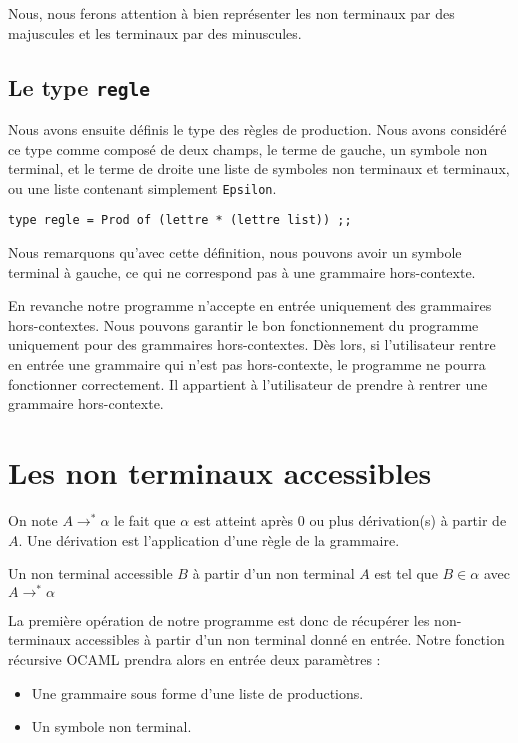 \documentclass[11pt,a4paper]{article}
\def\code#1{\texttt{#1}} %
\begin{document}
Nous, nous ferons attention à bien représenter les non terminaux
par des majuscules et les terminaux par des minuscules.

\subsection{Le type \code{regle}}

Nous avons ensuite définis le type des règles de production.
Nous avons considéré ce type comme composé de deux champs, le
terme de gauche, un symbole non terminal, et le terme de droite
une liste de symboles non terminaux et terminaux, ou une liste
contenant simplement \code{Epsilon}.

\begin{verbatim}
type regle = Prod of (lettre * (lettre list)) ;;
\end{verbatim}

Nous remarquons qu'avec cette définition, nous pouvons
avoir un symbole terminal à gauche, ce qui ne correspond pas
à une grammaire hors-contexte.

En revanche notre programme n'accepte en entrée uniquement des
grammaires hors-contextes. Nous pouvons garantir le bon fonctionnement
du programme uniquement pour des grammaires hors-contextes.
Dès lors, si l'utilisateur rentre en entrée une grammaire qui
n'est pas hors-contexte, le programme ne pourra fonctionner
correctement. Il appartient à l'utilisateur de prendre à rentrer
une grammaire hors-contexte.

\newpage


\section{Les non terminaux accessibles}

On note $A \rightarrow^* \alpha$ le fait que $\alpha$ est atteint après
0 ou plus dérivation(s) à partir de $A$. Une dérivation est l'application d'une règle de la grammaire.

Un non terminal accessible $B$ à partir d'un non terminal $A$ est tel que
$B \in \alpha$ avec $A \rightarrow^* \alpha$
\newline

La première opération de notre programme est donc de récupérer les
non-terminaux accessibles à partir d'un non terminal donné
en entrée. Notre fonction récursive OCAML prendra alors en
entrée deux paramètres :
\begin{itemize}
    \item Une grammaire sous forme d'une liste de productions.
    \item Un symbole non terminal.
\end{itemize}
\end{document}
